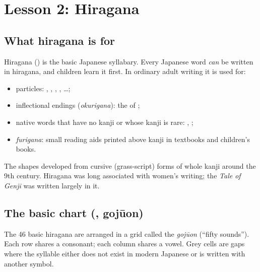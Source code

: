 \chapter{Lesson 2: Hiragana}

\section{What hiragana is for}

Hiragana () is the basic Japanese syllabary. Every Japanese word
\emph{can} be written in hiragana, and children learn it first. In ordinary adult
writing it is used for:
\begin{itemize}
  \item particles: , , , , \ldots;
  \item inflectional endings (\emph{okurigana}): the  of ;
  \item native words that have no kanji or whose kanji is rare: , ;
  \item \emph{furigana}: small reading aids printed above kanji in textbooks and
        children's books.
\end{itemize}

The shapes developed from cursive (grass-script) forms of whole kanji around the 9th
century. Hiragana was long associated with women's writing; the \emph{Tale of Genji} was
written largely in it.

\section{The basic chart (, gojūon)}

The 46 basic hiragana are arranged in a grid called the \emph{gojūon} (``fifty sounds'').
Each row shares a consonant; each column shares a vowel. Grey cells are gaps where the
syllable either does not exist in modern Japanese or is written with another symbol.

